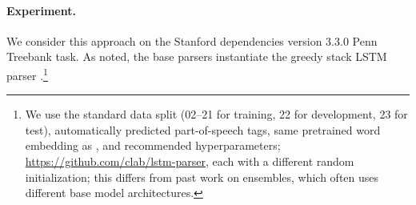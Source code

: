\documentclass[11pt,letterpaper]{article}
\newcommand{\ignore}[1]{}
\newcommand{\nascomment}[1]{\ignore{\textcolor{blue}{{\textbf{[#1 --\textsc{nas}]}}}}}
\newcommand{\miguelcomment}[1]{\ignore{\textcolor{red}{{\textbf{[#1 --\textsc{miguel}]}}}}}
\begin{document}
\paragraph{Experiment.}


We consider this approach on the Stanford dependencies version 3.3.0 \cite{stanford_dependencies} Penn Treebank task.
As noted, the base parsers instantiate the greedy stack LSTM parser \cite{stack_lstm}.\footnote{We use the standard data split (02--21 for training, 22 for development, 23 for test), automatically predicted part-of-speech tags, same pretrained word embedding as , and recommended hyperparameters; \url{https://github.com/clab/lstm-parser},\ignore{\miguelcomment{and pretrained word embeddings -> just say that it is the same setting as the best result of dyer et al. 2015}} each with a different random initialization; this differs
from past work on ensembles, which often uses different base model architectures. \ignore{\miguelcomment{We are using different base models since they have different random initialization... maybe explain (accuracy)? otherwise the reader might be confused with the fact that ensembling the same parser 20 times improves the accuracy}}  \ignore{\nascomment{need to explain jackknifing here?}}}



\begin{table}
\centering
{}
\caption{PTB-SD task:  ensembles improve over a strong greedy baseline.
UEM indicates unlabeled exact match. \ignore{\nascomment{don't forget to fill in UEM numbers if we have them}}
\label{ensemble_result}}
\end{table}
\end{document}
